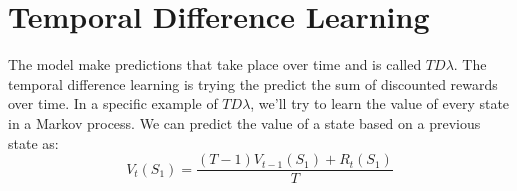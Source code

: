 \documentclass{article}
\begin{document}
\section{Temporal Difference Learning}
The model make predictions that take place over time and is called $TD\lambda$. The temporal difference learning is trying the predict the sum of discounted rewards over time. In a specific example of $TD\lambda$, we'll try to learn the value of every state in a Markov process. We can predict the value of a state based on a previous state as:
\begin{equation*}
  V_t(S_1) = \frac{(T - 1) V_{t - 1}(S_1) + R_t(S_1)}{T}
\end{equation*}
\end{document}
